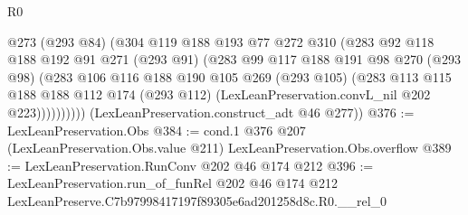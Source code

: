 \begin{lexlean}{R0}
\begin{coremodule}
              @273
              (@293 @84)
              (@304
                @119
                @188
                @193
                @77
                @272
                @310
                (@283
                  @92
                  @118
                  @188
                  @192
                  @91
                  @271
                  (@293 @91)
                  (@283
                    @99
                    @117
                    @188
                    @191
                    @98
                    @270
                    (@293 @98)
                    (@283
                      @106
                      @116
                      @188
                      @190
                      @105
                      @269
                      (@293 @105)
                      (@283
                        @113
                        @115
                        @188
                        @188
                        @112
                        @174
                        (@293 @112)
                        (LexLeanPreservation.convL_nil @202 @223))))))))))
      (LexLeanPreservation.construct_adt @46 @277))
@376 := LexLeanPreservation.Obs
@384 := cond.{1} @376 @207 (LexLeanPreservation.Obs.value @211) LexLeanPreservation.Obs.overflow
@389 := LexLeanPreservation.RunConv @202 @46 @174 @212
@396 := LexLeanPreservation.run_of_funRel
    @202
    @46
    @174
    @212
    LexLeanPreserve.C7b97998417197f89305e6ad201258d8c.R0.__rel_0
\end{coremodule}
\end{lexlean}
